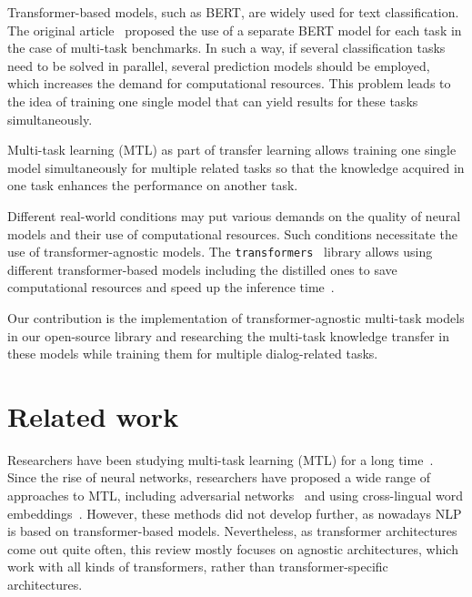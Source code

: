 Transformer-based models, such as BERT, are widely used for text classification. The original article~\cite{bert} proposed the use of a separate BERT model for each task in the case of multi-task benchmarks. In such a way, if several classification tasks need to be solved in parallel, several prediction models should be employed, which increases the demand for computational resources. This problem leads to the idea of training one single model that can yield results for these tasks simultaneously. 

Multi-task learning (MTL) as part of transfer learning allows training one single model simultaneously for multiple related tasks so that the knowledge acquired in one task enhances the performance on another task.

Different real-world conditions may put various demands on the quality of neural models and their use of computational resources. Such conditions necessitate the use of transformer-agnostic models. The \texttt{transformers}~\cite{huggingface_transformers} library allows using different transformer-based models including the distilled ones to save computational resources and speed up the inference time~\cite{alina}. 

\iffalse
Our contribution is the implementation of transformer-agnostic multi-task models in DeepPavlov and researching the multi-task knowledge transfer in these models while training them for multiple dialog-related tasks.
\else
Our contribution is the implementation of transformer-agnostic multi-task models in our open-source library and researching the multi-task knowledge transfer in these models while training them for multiple dialog-related tasks.
\fi
\section{Related work}

Researchers have been studying multi-task learning (MTL) for a long time~\cite{caruana1997multitask}. Since the rise of neural networks, researchers have proposed a wide range of approaches to MTL, including adversarial networks~\cite{wang-etal-2018-personalized} and using cross-lingual word embeddings~\cite{buryat}. However, these methods did not develop further, as nowadays NLP is based on transformer-based models. Nevertheless, as transformer architectures come out quite often, this review mostly focuses on agnostic architectures, which work with all kinds of transformers, rather than transformer-specific architectures.

